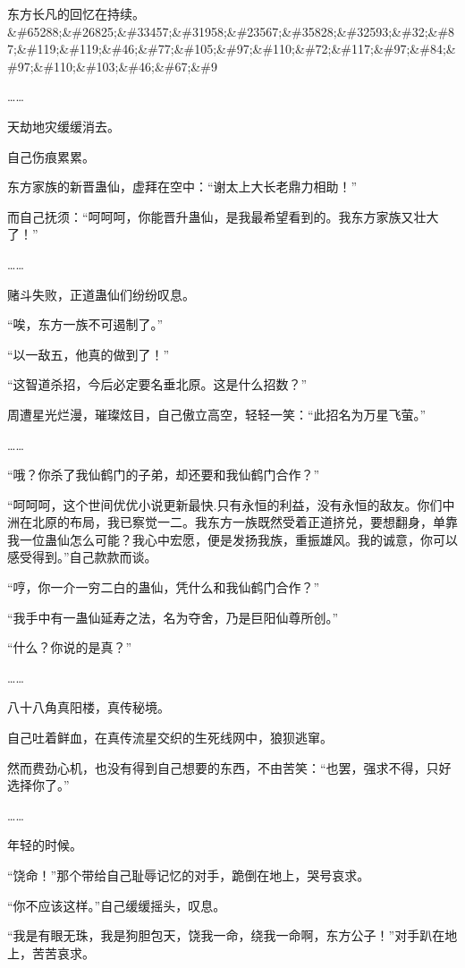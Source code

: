 
\begin{this_body}

东方长凡的回忆在持续。\&\#65288;\&\#26825;\&\#33457;\&\#31958;\&\#23567;\&\#35828;\&\#32593;\&\#32;\&\#87;\&\#119;\&\#119;\&\#46;\&\#77;\&\#105;\&\#97;\&\#110;\&\#72;\&\#117;\&\#97;\&\#84;\&\#97;\&\#110;\&\#103;\&\#46;\&\#67;\&\#9

……

天劫地灾缓缓消去。

自己伤痕累累。

东方家族的新晋蛊仙，虚拜在空中：“谢太上大长老鼎力相助！”

而自己抚须：“呵呵呵，你能晋升蛊仙，是我最希望看到的。我东方家族又壮大了！”

……

赌斗失败，正道蛊仙们纷纷叹息。

“唉，东方一族不可遏制了。”

“以一敌五，他真的做到了！”

“这智道杀招，今后必定要名垂北原。这是什么招数？”

周遭星光烂漫，璀璨炫目，自己傲立高空，轻轻一笑：“此招名为万星飞萤。”

……

“哦？你杀了我仙鹤门的子弟，却还要和我仙鹤门合作？”

“呵呵呵，这个世间优优小说更新最快.只有永恒的利益，没有永恒的敌友。你们中洲在北原的布局，我已察觉一二。我东方一族既然受着正道挤兑，要想翻身，单靠我一位蛊仙怎么可能？我心中宏愿，便是发扬我族，重振雄风。我的诚意，你可以感受得到。”自己款款而谈。

“哼，你一介一穷二白的蛊仙，凭什么和我仙鹤门合作？”

“我手中有一蛊仙延寿之法，名为夺舍，乃是巨阳仙尊所创。”

“什么？你说的是真？”

……

八十八角真阳楼，真传秘境。

自己吐着鲜血，在真传流星交织的生死线网中，狼狈逃窜。

然而费劲心机，也没有得到自己想要的东西，不由苦笑：“也罢，强求不得，只好选择你了。”

……

年轻的时候。

“饶命！”那个带给自己耻辱记忆的对手，跪倒在地上，哭号哀求。

“你不应该这样。”自己缓缓摇头，叹息。

“我是有眼无珠，我是狗胆包天，饶我一命，绕我一命啊，东方公子！”对手趴在地上，苦苦哀求。


\end{this_body}
